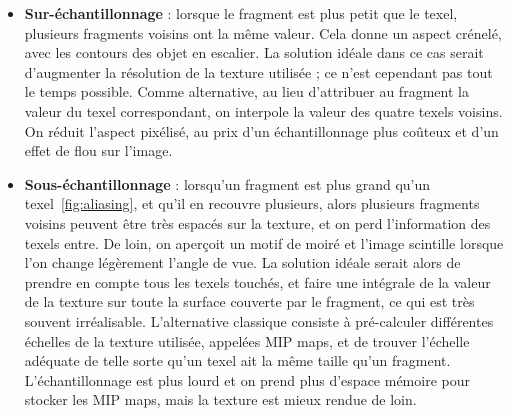 \begin{itemize}
    \item \textbf{Sur-échantillonnage} : lorsque le fragment est plus petit que le texel, plusieurs fragments voisins ont la même valeur. Cela donne un aspect crénelé, avec les contours des objet en escalier. La solution idéale dans ce cas serait d'augmenter la résolution de la texture utilisée ; ce n'est cependant pas tout le temps possible. Comme alternative, au lieu d'attribuer au fragment la valeur du texel correspondant, on interpole la valeur des quatre texels voisins. On réduit l'aspect pixélisé, au prix d'un échantillonnage plus coûteux et d'un effet de flou sur l'image. 
    \item \textbf{Sous-échantillonnage} : lorsqu'un fragment est plus grand qu'un texel~\ref{fig:aliasing}, et qu'il en recouvre plusieurs, alors plusieurs fragments voisins peuvent être très espacés sur la texture, et on perd l'information des texels entre. De loin, on aperçoit un motif de moiré et l'image scintille lorsque l'on change légèrement l'angle de vue. La solution idéale serait alors de prendre en compte tous les texels touchés, et faire une intégrale de la valeur de la texture sur toute la surface couverte par le fragment, ce qui est très souvent irréalisable. L'alternative classique consiste à pré-calculer différentes échelles de la texture utilisée, appelées MIP maps, et de trouver l'échelle adéquate de telle sorte qu'un texel ait la même taille qu'un fragment. L'échantillonnage est plus lourd et on prend plus d'espace mémoire pour stocker les MIP maps, mais la texture est mieux rendue de loin.
\end{itemize}


